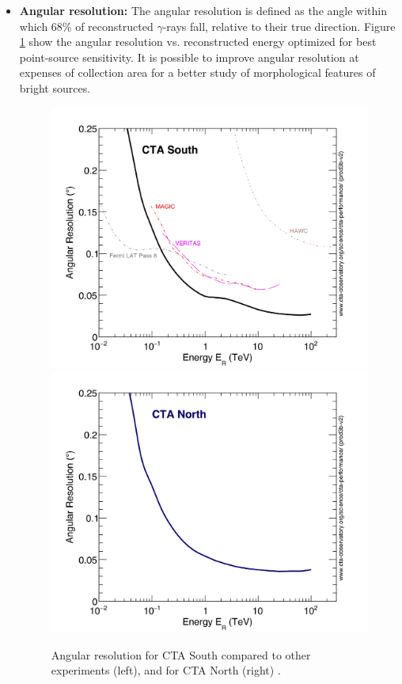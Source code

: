 \documentclass[main.tex]{subfiles}
\begin{document}
\begin{itemize}
\item \textbf{Angular resolution:} The angular resolution is defined as the angle within which 68\% of reconstructed $\gamma$-rays fall, relative to their true direction. Figure \ref{fig:angres} show the angular resolution vs. reconstructed energy optimized for best point-source sensitivity. It is possible to improve angular resolution at expenses of collection area for a better study of morphological features of bright sources.\\
  
  \begin{figure}[!htb]
    \includegraphics[width=\linewidth]{Pictures/CTA-Performance-prod3b-v2-Comparison-AngularResolution-OtherInstruments.pdf}
    \endminipage\hfill
    \includegraphics[width=\linewidth]{Pictures/CTA-Performance-prod3b-v2-North-20deg-AngularResolution.pdf}
    \endminipage\hfill
    \caption{\label{fig:angres} Angular resolution for CTA South compared to other experiments (left), and for CTA North (right) \cite{CTAPerformance}.}
  \end{figure}


\end{itemize}
\end{document}
